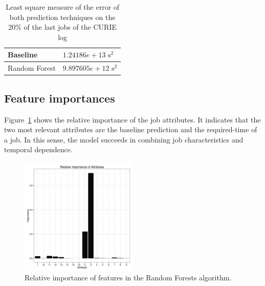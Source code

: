 \documentclass{article}
\begin{document}
\begin{table}[ht]
  \centering

  \begin{tabular}{|l|l|}
    \hline
    Baseline  &  $1.24186e+13 \mbox{ s}^2$   \\
    \hline
    Random Forest &  $9.897605e+12 \mbox{ s}^2$ \\
    \hline
  \end{tabular}
  \caption{Least square measure of the error of both prediction techniques on the 20\% of the last jobs of the CURIE log}
  \label{fig:lsq}
\end{table}


\subsection{Feature importances}
\label{sub:feature_importances}
Figure~\ref{fig:importances} shows the relative importance of the job attributes. It indicates that the two most relevant attributes are the baseline prediction and the required-time of a job. In this sense, the model succeeds in combining job characteristics and temporal dependence.

\begin{figure}[ht]
  \centering
  \includegraphics[width=0.5\textwidth]{interpretation.png}
  \caption{Relative importance of features in the Random Forests algorithm.}
  \label{fig:importances}
\end{figure}

\end{document}
